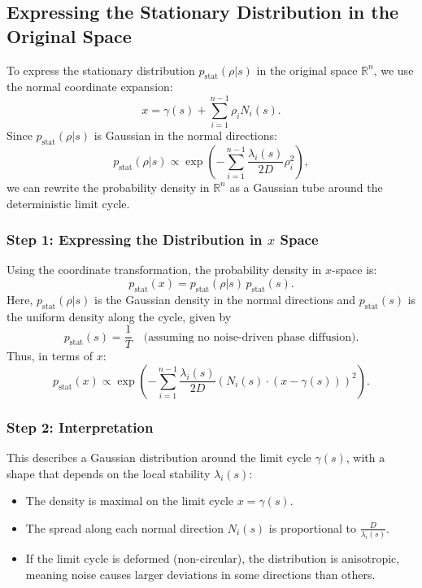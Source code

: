 \documentclass{article}
\theoremstyle{definition} \newtheorem{definition}{Definition}
\theoremstyle{remark} \newtheorem{remark}{Remark}
\newcounter{ct}
\begin{document}
\subsection{Expressing the Stationary Distribution in the Original Space}
To express the stationary distribution $p_{\text{stat}}(\rho | s)$ in the original space $\mathbb{R}^n$, we use the normal coordinate expansion:
\begin{equation}
    x = \gamma(s) + \sum_{i=1}^{n-1} \rho_i N_i(s).
\end{equation}
Since $p_{\text{stat}}(\rho | s)$ is Gaussian in the normal directions:
\begin{equation}
    p_{\text{stat}}(\rho | s) \propto \exp \left( - \sum_{i=1}^{n-1} \frac{\lambda_i(s)}{2D} \rho_i^2 \right),
\end{equation}
we can rewrite the probability density in $\mathbb{R}^n$ as a Gaussian tube around the deterministic limit cycle.


\subsubsection{Step 1: Expressing the Distribution in $x$ Space}
Using the coordinate transformation, the probability density in $x$-space is:
\begin{equation}
    p_{\text{stat}}(x) = p_{\text{stat}}(\rho | s) \, p_{\text{stat}}(s).
\end{equation}
Here, $p_{\text{stat}}(\rho | s)$ is the Gaussian density in the normal directions and $p_{\text{stat}}(s)$ is the uniform density along the cycle, given by
\begin{equation}
    p_{\text{stat}}(s) = \frac{1}{T} \quad \text{(assuming no noise-driven phase diffusion)}.
\end{equation}
Thus, in terms of $x$:
\begin{equation}
    p_{\text{stat}}(x) \propto \exp \left( - \sum_{i=1}^{n-1} \frac{\lambda_i(s)}{2D} \left( N_i(s) \cdot (x - \gamma(s)) \right)^2 \right).
\end{equation}


\subsubsection{Step 2: Interpretation}
This describes a Gaussian distribution around the limit cycle $\gamma(s)$, with a shape that depends on the local stability $\lambda_i(s)$:
\begin{itemize}
    \item The density is maximal on the limit cycle $x = \gamma(s)$.
    \item The spread along each normal direction $N_i(s)$ is proportional to $\frac{D}{\lambda_i(s)}$.
    \item If the limit cycle is deformed (non-circular), the distribution is anisotropic, meaning noise causes larger deviations in some directions than others.
\end{itemize}
\end{document}
